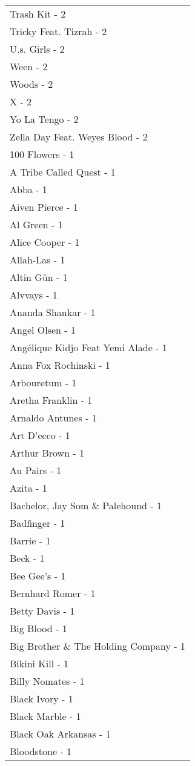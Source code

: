 \documentclass[
]{article}
\begin{document}
\begin{longtable}{l}
Trash Kit - 2 \\ 
Tricky Feat. Tizrah - 2 \\ 
U.s. Girls - 2 \\ 
Ween - 2 \\ 
Woods - 2 \\ 
X - 2 \\ 
Yo La Tengo - 2 \\ 
Zella Day Feat. Weyes Blood - 2 \\ 
100 Flowers - 1 \\ 
A Tribe Called Quest - 1 \\ 
Abba - 1 \\ 
Aiven Pierce - 1 \\ 
Al Green - 1 \\ 
Alice Cooper - 1 \\ 
Allah-Las - 1 \\ 
Altin Gün - 1 \\ 
Alvvays - 1 \\ 
Ananda Shankar - 1 \\ 
Angel Olsen - 1 \\ 
Angélique Kidjo Feat Yemi Alade - 1 \\ 
Anna Fox Rochinski - 1 \\ 
Arbouretum - 1 \\ 
Aretha Franklin - 1 \\ 
Arnaldo Antunes - 1 \\ 
Art D'ecco - 1 \\ 
Arthur Brown - 1 \\ 
Au Pairs - 1 \\ 
Azita - 1 \\ 
Bachelor, Jay Som \& Palehound - 1 \\ 
Badfinger - 1 \\ 
Barrie - 1 \\ 
Beck - 1 \\ 
Bee Gee's - 1 \\ 
Bernhard Romer - 1 \\ 
Betty Davis - 1 \\ 
Big Blood - 1 \\ 
Big Brother \& The Holding Company - 1 \\ 
Bikini Kill - 1 \\ 
Billy Nomates - 1 \\ 
Black Ivory - 1 \\ 
Black Marble - 1 \\ 
Black Oak Arkansas - 1 \\ 
Bloodstone - 1 \\ 

\end{longtable}
\end{document}
